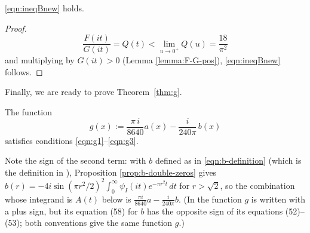 \begin{corollary}\label{cor:ineqBnew}\leanok
\eqref{eqn:ineqBnew} holds.
\end{corollary}
\begin{proof}\leanok
\begin{equation}
    \frac{F(it)}{G(it)} = Q(t) < \lim_{u \to 0^+} Q(u) = \frac{18}{\pi^2}
\end{equation}
and multiplying by $G(it) > 0$ (Lemma \ref{lemma:F-G-pos}), \eqref{eqn:ineqBnew} follows.
\end{proof}


Finally, we are ready to prove Theorem~\ref{thm:g}.
\begin{theorem}\label{thm:g1}
\leanok
The function
$$g(x):=\frac{\pi\,i}{8640}a(x)-\frac{i}{240\pi}\,b(x)$$
satisfies conditions \eqref{eqn:g1}--\eqref{eqn:g3}.
\end{theorem}
Note the sign of the second term: with $b$ defined as in \eqref{eqn:b-definition} (which is the definition in \cite{Via2017}), Proposition \ref{prop:b-double-zeros} gives $b(r) = -4i \sin(\pi r^2/2)^2 \int_0^\infty \psi_I(it) e^{-\pi r^2 t}\,dt$ for $r > \sqrt{2}$, so the combination whose integrand is $A(t)$ below is $\frac{\pi i}{8640} a - \frac{i}{240 \pi} b$. (In \cite{Via2017} the function $g$ is written with a plus sign, but its equation (58) for $b$ has the opposite sign of its equations (52)--(53); both conventions give the same function $g$.)
